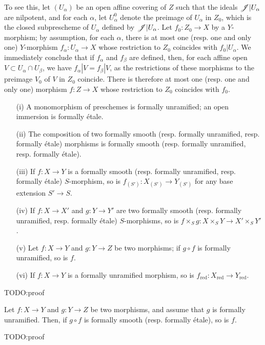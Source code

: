 \begin{remark}[17.1.2]
\begin{enumerate}
		To see this, let $(U_\alpha)$ be an open affine covering of $Z$ such that the ideals $\mathscr{J}|U_\alpha$ are nilpotent, and for each $\alpha$, let $U_\alpha ^0$ denote the preimage of $U_\alpha$ in $Z_0$, which is the closed subprescheme of $U_\alpha$ defined by $\mathscr{J}|U_\alpha$. Let $f_0: Z_0 \to X$ by a $Y$-morphism; by assumption, for each $\alpha$, there is at most one (resp. one and only one) $Y$-morphism $f_\alpha: U_\alpha \to X$ whose restriction to $Z_0$ coincides with $f_0|U_\alpha$. We immediately conclude that if $f_\alpha$ and $f_\beta$ are defined, then, for each affine open $V \subset U_\alpha \cap U_\beta$, we have $f_\alpha|V = f_\beta|V$, as the restrictions of these morphisms to the preimage $V_0$ of $V$ in $Z_0$ coincide. There is therefore at most one (resp. one and only one) morphism $f : Z \to X$ whose restriction to $Z_0$ coincides with $f_0$.
\end{enumerate}
\end{remark}

\begin{proposition}[17.1.3]
\label{IV.17.1.3}
\begin{enumerate}
\item[(i)] A monomorphism of preschemes is formally unramified; an open immersion is formally \'etale.
\item[(ii)] The composition of two formally smooth (resp. formally unramified, resp. formally \'etale) morphisms is formally smooth (resp. formally unramified, resp. formally \'etale).
\item[(iii)] If $f:X\to Y$ is a formally smooth (resp. formally unramified, resp. formally \'etale) $S$-morphism, so is $f_{(S')}:X_{(S')}\to Y_{(S')}$ for any base extension $S'\to S$.
\item[(iv)] If $f: X \to X'$ and $g: Y \to Y'$ are two formally smooth (resp. formally unramified, resp. formally \'etale) $S$-morphisms, so is $f \times_{S} g: X\times_{S} Y \to X' \times_{S} Y'$.
\item[(v)] Let $f : X \to Y$ and $g : Y \to Z$ be two morphisms; if $g \circ f$ is formally unramified, so is $f$.
\item[(vi)] If $f : X \to Y$ is a formally unramified morphism, so is $f_{\mathrm{red}}: X_{\mathrm{red}} \to Y_{\mathrm{red}}$.
\end{enumerate}
\end{proposition}
TODO:proof

\begin{proposition}[17.1.4]
\label{IV.17.1.4}
	Let $f: X \to Y$ and $g: Y \to Z$ be two morphisms, and assume that $g$ is formally unramified. Then, if $g \circ f$ is formally smooth (resp. formally \'etale), so is $f$.
\end{proposition}
TODO:proof

